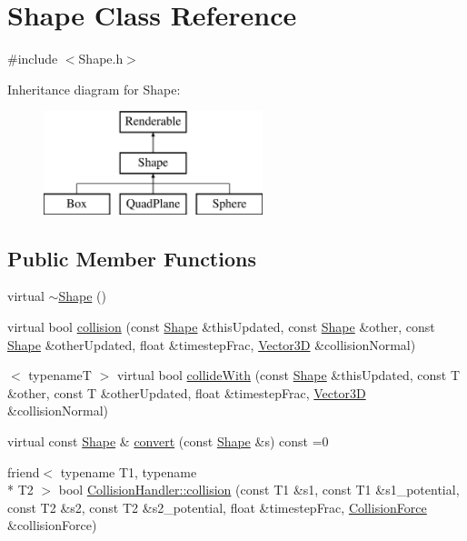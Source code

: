 \hypertarget{class_shape}{\section{Shape Class Reference}
\label{class_shape}
}


{\ttfamily \#include $<$Shape.\-h$>$}

Inheritance diagram for Shape\-:\begin{figure}[H]
\begin{center}
\leavevmode
\includegraphics[height=3.000000cm]{class_shape}
\end{center}
\end{figure}
\subsection*{Public Member Functions}
\begin{DoxyCompactItemize}
\item 
virtual \hyperlink{class_shape_ac3b9fc48965274893f25b18aa14ba665}{$\sim$\-Shape} ()
\item 
virtual bool \hyperlink{class_shape_af62169dcec74b96697f74d9740d03caa}{collision} (const \hyperlink{class_shape}{Shape} \&this\-Updated, const \hyperlink{class_shape}{Shape} \&other, const \hyperlink{class_shape}{Shape} \&other\-Updated, float \&timestep\-Frac, \hyperlink{class_vector3_d}{Vector3\-D} \&collision\-Normal)
\item 
$<$ typename\-T $>$ virtual bool \hyperlink{class_shape_a4f36cc75a8ee27039ec783d4e3fe40f5}{collide\-With} (const \hyperlink{class_shape}{Shape} \&this\-Updated, const T \&other, const T \&other\-Updated, float \&timestep\-Frac, \hyperlink{class_vector3_d}{Vector3\-D} \&collision\-Normal)
\item 
virtual const \hyperlink{class_shape}{Shape} \& \hyperlink{class_shape_ac07463606035fd9f8087a0673ca2c1a9}{convert} (const \hyperlink{class_shape}{Shape} \&s) const =0
\item 
friend$<$ typename T1, typename \\*
T2 $>$ bool \hyperlink{class_shape_ae8db86e01fff600eb320502d2f9f49e9}{Collision\-Handler\-::collision} (const T1 \&s1, const T1 \&s1\-\_\-potential, const T2 \&s2, const T2 \&s2\-\_\-potential, float \&timestep\-Frac, \hyperlink{class_collision_force}{Collision\-Force} \&collision\-Force)
\end{DoxyCompactItemize}
